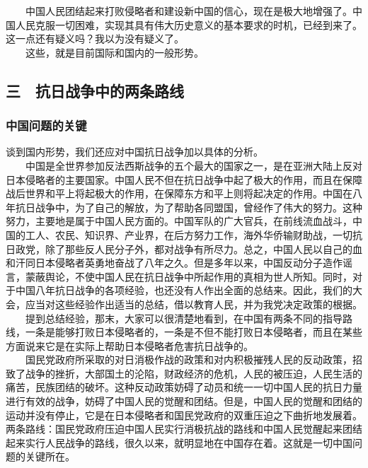 \documentclass[cn,11pt,chinese]{elegantbook}
\def\myformat#1{\hfil\hfil #1}
\begin{document}
　　中国人民团结起来打败侵略者和建设新中国的信心，现在是极大地增强了。中国人民克服一切困难，实现其具有伟大历史意义的基本要求的时机，已经到来了。这一点还有疑义吗？我以为没有疑义了。\\
　　这些，就是目前国际和国内的一般形势。\\
\subsection*{\myformat{三　抗日战争中的两条路线}}
\subsubsection*{\myformat{中国问题的关键}}
谈到国内形势，我们还应对中国抗日战争加以具体的分析。\\
　　中国是全世界参加反法西斯战争的五个最大的国家之一，是在亚洲大陆上反对日本侵略者的主要国家。中国人民不但在抗日战争中起了极大的作用，而且在保障战后世界和平上将起极大的作用，在保障东方和平上则将起决定的作用。中国在八年抗日战争中，为了自己的解放，为了帮助各同盟国，曾经作了伟大的努力。这种努力，主要地是属于中国人民方面的。中国军队的广大官兵，在前线流血战斗，中国的工人、农民、知识界、产业界，在后方努力工作，海外华侨输财助战，一切抗日政党，除了那些反人民分子外，都对战争有所尽力。总之，中国人民以自己的血和汗同日本侵略者英勇地奋战了八年之久。但是多年以来，中国反动分子造作谣言，蒙蔽舆论，不使中国人民在抗日战争中所起作用的真相为世人所知。同时，对于中国八年抗日战争的各项经验，也还没有人作出全面的总结来。因此，我们的大会，应当对这些经验作出适当的总结，借以教育人民，并为我党决定政策的根据。\\
　　提到总结经验，那末，大家可以很清楚地看到，在中国有两条不同的指导路线，一条是能够打败日本侵略者的，一条是不但不能打败日本侵略者，而且在某些方面说来它是在实际上帮助日本侵略者危害抗日战争的。\\
　　国民党政府所采取的对日消极作战的政策和对内积极摧残人民的反动政策，招致了战争的挫折，大部国土的沦陷，财政经济的危机，人民的被压迫，人民生活的痛苦，民族团结的破坏。这种反动政策妨碍了动员和统一一切中国人民的抗日力量进行有效的战争，妨碍了中国人民的觉醒和团结。但是，中国人民的觉醒和团结的运动并没有停止，它是在日本侵略者和国民党政府的双重压迫之下曲折地发展着。两条路线：国民党政府压迫中国人民实行消极抗战的路线和中国人民觉醒起来团结起来实行人民战争的路线，很久以来，就明显地在中国存在着。这就是一切中国问题的关键所在。\\
\end{document}
